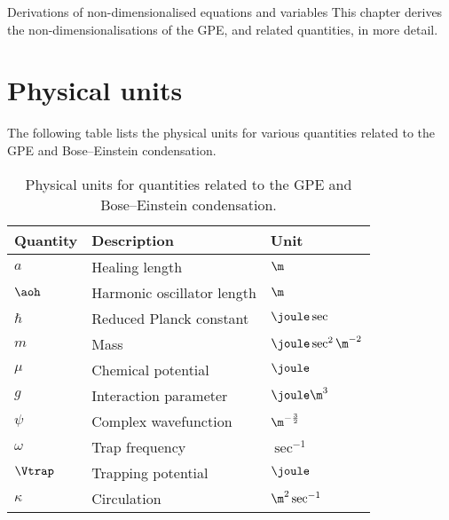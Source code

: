 %
%
%

\begin{chapter}{\label{cha:nondim}Derivations of non-dimensionalised equations
and variables}
  This chapter derives the non-dimensionalisations of the GPE, and related
  quantities, in more detail.

  \section{Physical units}
  The following table lists the physical units for various quantities
  related to the GPE and Bose--Einstein condensation.
  \begin{table}[h]
    \centering
    \begin{tabular}{lll}
      \hline
      Quantity & Description & Unit \\
      \hline
      $a$      & Healing length & $\m$ \\
      $\aoh$   & Harmonic oscillator length & $\m$ \\
      $\hbar$  & Reduced Planck constant & $\joule\sec$ \\
      $m$      & Mass & $\joule\sec^{2}\m^{-2}$ \\
      $\mu$    & Chemical potential & $\joule$ \\
      $g$      & Interaction parameter & $\joule\m^{3}$ \\
      $\psi$   & Complex wavefunction & $\m^{-\frac{3}{2}}$ \\
      $\omega$ & Trap frequency & $\sec^{-1}$ \\
      $\Vtrap$ & Trapping potential & $\joule$ \\
      $\kappa$ & Circulation & $\m^{2}\sec^{-1}$ \\
      \hline\hline
    \end{tabular}
    \caption{Physical units for quantities related to the GPE and
      Bose--Einstein condensation.}
  \end{table}
  

\end{chapter}
